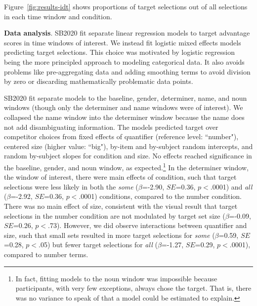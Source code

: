\documentclass[10pt,letterpaper]{article}
\newcommand{\figref}[1]{Figure~\ref{#1}}
\newcommand{\jd}[1]{\textcolor{Red}{\textbf{[jd: #1]}}}
\begin{document}
\figref{fig:results-idt} shows proportions of target selections out of all selections in each time window and condition. 


\textbf{Data analysis}. SB2020 fit separate linear regression models to target advantage scores in time windows of interest. We instead fit logistic mixed effects models predicting target selections. This choice was motivated by logistic regression being the more principled approach to modeling categorical data. It also avoids problems like pre-aggregating data and adding smoothing terms to avoid division by zero or discarding mathematically problematic data points. %

SB2020 fit separate models to the baseline, gender, determiner, name, and noun windows (though only the determiner and name windows were of interest). We collapsed the name window into the determiner window because the name does not add disambiguating information. The models predicted target over competitor choices from fixed effects of quantifier (reference level: ``number"), centered size (higher value: ``big"), by-item and by-subject random intercepts, and random by-subject slopes for condition and size. No effects reached significance in the baseline, gender, and noun window, as expected.\footnote{In fact, fitting models to the noun window was impossible because participants, with very few exceptions, always chose the target. That is, there was no variance to speak of that a model could be estimated to explain.}  In the determiner window, the window of interest, there were main effects of condition, such that target selections were less likely in both the \emph{some} ($\beta$=-2.90, $SE$=0.36, $p<$.0001) and \emph{all} ($\beta$=-2.92, $SE$=0.36, $p<$.0001) conditions, compared to the number condition. There was no main effect of size, consistent with the visual result that target selections in the number condition are not modulated by  target set size ($\beta$=-0.09, $SE$=0.26, $p<$.73). However, we did observe interactions between quantifier and size, such that small sets resulted in more target selections for \emph{some} ($\beta$=0.59, $SE$=0.28, $p<$.05) but fewer target selections for \emph{all} ($\beta$=-1.27, $SE$=0.29, $p<$.0001), compared to number terms. 

\end{document}
